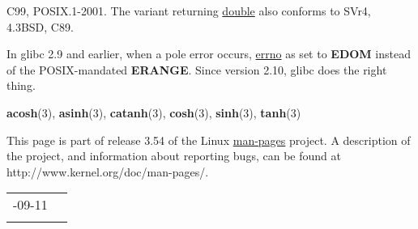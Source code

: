 \documentclass[]{article}
\let\realtextbf=\textbf
\renewcommand{\textbf}[1]{\textcolor{boldcolor}{\realtextbf{#1}}}
\renewcommand{\emph}[1]{\underline{#1}}
\begin{document}

C99, POSIX.1-2001. The variant returning \emph{double} also conforms to
SVr4, 4.3BSD, C89.


In glibc 2.9 and earlier, when a pole error occurs, \emph{errno} as set
to \textbf{EDOM} instead of the POSIX-mandated \textbf{ERANGE}. Since
version 2.10, glibc does the right thing.


\textbf{acosh}(3), \textbf{asinh}(3), \textbf{catanh}(3),
\textbf{cosh}(3), \textbf{sinh}(3), \textbf{tanh}(3)


This page is part of release 3.54 of the Linux \emph{man-pages} project.
A description of the project, and information about reporting bugs, can
be found at http://www.kernel.org/doc/man-pages/.

\begin{longtable}[c]{@{}ll@{}}
\toprule\addlinespace
2010-09-11 &
\\\addlinespace
\bottomrule
\end{longtable}
\end{document}

